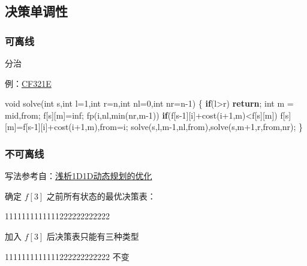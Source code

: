 \documentclass[
]{article}
\newenvironment{Shaded}{}{}
\newcommand{\ControlFlowTok}[1]{\textcolor[rgb]{0.00,0.44,0.13}{\textbf{#1}}}
\newcommand{\DataTypeTok}[1]{\textcolor[rgb]{0.56,0.13,0.00}{#1}}
\newcommand{\DecValTok}[1]{\textcolor[rgb]{0.25,0.63,0.44}{#1}}
\newcommand{\NormalTok}[1]{#1}
\begin{document}
\hypertarget{ux51b3ux7b56ux5355ux8c03ux6027}{%
\subsection{决策单调性}\label{ux51b3ux7b56ux5355ux8c03ux6027}}

\hypertarget{ux53efux79bbux7ebf}{%
\subsubsection{可离线}\label{ux53efux79bbux7ebf}}

分治

例：\href{https://www.luogu.com.cn/problem/CF321E}{CF321E}

\begin{Shaded}
\begin{Highlighting}[]
\DataTypeTok{void}\NormalTok{ solve(}\DataTypeTok{int}\NormalTok{ s,}\DataTypeTok{int}\NormalTok{ l=}\DecValTok{1}\NormalTok{,}\DataTypeTok{int}\NormalTok{ r=n,}\DataTypeTok{int}\NormalTok{ nl=}\DecValTok{0}\NormalTok{,}\DataTypeTok{int}\NormalTok{ nr=n{-}}\DecValTok{1}\NormalTok{)}
\NormalTok{\{}
    \ControlFlowTok{if}\NormalTok{(l\textgreater{}r) }\ControlFlowTok{return}\NormalTok{;}
    \DataTypeTok{int}\NormalTok{ m = mid,from; f[s][m]=inf; }
\NormalTok{    fp(i,nl,min(nr,m{-}}\DecValTok{1}\NormalTok{))}
        \ControlFlowTok{if}\NormalTok{(f[s{-}}\DecValTok{1}\NormalTok{][i]+cost(i+}\DecValTok{1}\NormalTok{,m)\textless{}f[s][m])}
\NormalTok{            f[s][m]=f[s{-}}\DecValTok{1}\NormalTok{][i]+cost(i+}\DecValTok{1}\NormalTok{,m),from=i;}
\NormalTok{    solve(s,l,m{-}}\DecValTok{1}\NormalTok{,nl,from),solve(s,m+}\DecValTok{1}\NormalTok{,r,from,nr);}
\NormalTok{\}}
\end{Highlighting}
\end{Shaded}

\hypertarget{ux4e0dux53efux79bbux7ebf}{%
\subsubsection{不可离线}\label{ux4e0dux53efux79bbux7ebf}}

写法参考自：\href{https://max.book118.com/html/2017/0827/130420281.shtm}{浅析1D1D动态规划的优化}

确定 \(f[3]\) 之前所有状态的最优决策表：

1111111111111222222222222

加入 \(f[3]\) 后决策表只能有三种类型

1111111111111222222222222 不变
\end{document}
